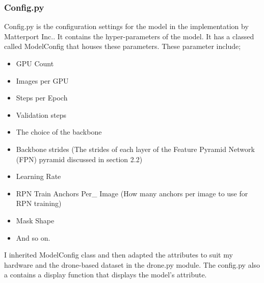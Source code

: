 \subsubsection{Config.py}
Config.py is the configuration settings for the model in the implementation by Matterport Inc.. It contains the hyper-parameters of the model. It has a classed called ModelConfig that houses these parameters. These parameter include;
 \begin{itemize}
   \item GPU Count
   \item Images per GPU
   \item Steps per Epoch
   \item Validation steps
   \item The choice of the backbone
   \item Backbone strides (The strides of each layer of the Feature Pyramid Network (FPN) pyramid discussed in section 2.2)
   \item Learning Rate
   \item RPN Train Anchors Per\_ Image (How many anchors per image to use for RPN training)
   \item Mask Shape
   \item And so on.
   
 \end{itemize}
 I inherited ModelConfig  class and then adapted the attributes to suit my hardware and the drone-based dataset in the drone.py module.  The config.py also a contains a display function that displays the model’s attribute.


